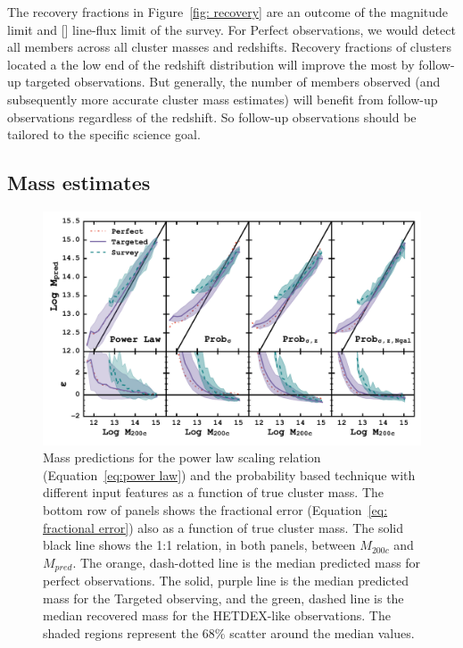 The recovery fractions in Figure~\ref{fig: recovery} are an outcome of the magnitude limit and \hbox{[]} line-flux limit of the survey. For Perfect observations, we would detect all members across all cluster masses and redshifts. Recovery fractions of clusters located a the low end of the redshift distribution will improve the most by follow-up targeted observations. But generally, the number of members observed (and subsequently more accurate cluster mass estimates) will benefit from follow-up observations regardless of the redshift. So follow-up observations should be tailored to the specific science goal.

\subsection{Mass estimates}
\begin{figure}
	\begin{center}
		\includegraphics[width=\textwidth]{figures1/Probcomparison.pdf} 
	\end{center}
	\caption[Probability based cluster mass predictions.]{Mass predictions for the power law scaling relation (Equation~\ref{eq:power law}) and the probability based technique with different input features as a function of true cluster mass. The bottom row of panels shows the fractional error (Equation~\ref{eq: fractional error}) also as a function of true cluster mass. The solid black line shows the 1:1 relation, in both panels, between $M_{200c}$ and $M_{pred}$. The orange, dash-dotted line is the median predicted mass for perfect observations. The solid, purple line is the median predicted mass for the Targeted observing, and the green, dashed line is the median recovered mass for the HETDEX-like observations. The shaded regions represent the 68\% scatter around the median values.}
	 \label{fig:Probability comparison} 
\end{figure}

